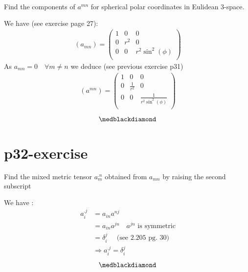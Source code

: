 \begin{tcolorbox}
Find the components of $a^{mn}$ for spherical polar coordinates in Eulidean 3-space.
\end{tcolorbox}
We have (see exercise page 27):
\begin{align}
\ (a_{mn}) = \begin{pmatrix}
 1& 0 & 0\\
0 & r^2 & 0 \\
0 & 0 & r^2\sin^2(\phi) \\
\end{pmatrix}
\end{align}
As $a_{mn} = 0 \quad \forall m \neq n$ we deduce (see previous exercise p31)
\begin{align}
\ (a^{mn}) = \begin{pmatrix}
 1& 0 & 0\\
0 & \frac{1}{r^2} & 0 \\
0 & 0 & \frac{1}{r^2\sin^2(\phi)}\\
\end{pmatrix}
\end{align}
$$\medblackdiamond$$
\newpage

\section{p32-exercise}

\begin{tcolorbox}
Find the mixed metric tensor  $a^{.n}_m$ obtained from $a_{mn}$ by raising the second subscript
\end{tcolorbox}
We have :
\begin{align}
\ a_{i}^{.j} &=  a_{in}a^{nj}\\
\ &=  a_{in}a^{jn}\quad a^{jn} \text{  is symmetric}\\
\ &= \delta^j_i \quad \text{ (see 2.205 pg. 30)}\\
\ &\Rightarrow a_{i}^{.j} = \delta^j_i 
\end{align}
$$\medblackdiamond$$
\newpage

